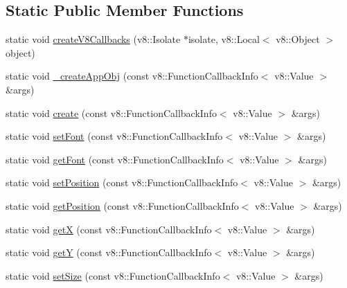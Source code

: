 \subsection*{Static Public Member Functions}
\begin{DoxyCompactItemize}
\item 
static void \mbox{\hyperlink{class_rad_j_a_v_1_1_g_u_i_1_1_g_object_a0f1685bec67283666b86f6203f39b91d}{create\+V8\+Callbacks}} (v8\+::\+Isolate $\ast$isolate, v8\+::\+Local$<$ v8\+::\+Object $>$ object)
\item 
static void \mbox{\hyperlink{class_rad_j_a_v_1_1_g_u_i_1_1_g_object_abc4ed6894b20794b891aedc8be3cb4a4}{\+\_\+create\+App\+Obj}} (const v8\+::\+Function\+Callback\+Info$<$ v8\+::\+Value $>$ \&args)
\item 
static void \mbox{\hyperlink{class_rad_j_a_v_1_1_g_u_i_1_1_g_object_a464807547d205bba7ab4208dd3fd0cd0}{create}} (const v8\+::\+Function\+Callback\+Info$<$ v8\+::\+Value $>$ \&args)
\item 
static void \mbox{\hyperlink{class_rad_j_a_v_1_1_g_u_i_1_1_g_object_a4ddf832d1cceee41b20792a4479bd106}{set\+Font}} (const v8\+::\+Function\+Callback\+Info$<$ v8\+::\+Value $>$ \&args)
\item 
static void \mbox{\hyperlink{class_rad_j_a_v_1_1_g_u_i_1_1_g_object_aeecc1caec38369cae568a380a0e4dc0c}{get\+Font}} (const v8\+::\+Function\+Callback\+Info$<$ v8\+::\+Value $>$ \&args)
\item 
static void \mbox{\hyperlink{class_rad_j_a_v_1_1_g_u_i_1_1_g_object_afa290a9dfceec5c365d11cb7943dea58}{set\+Position}} (const v8\+::\+Function\+Callback\+Info$<$ v8\+::\+Value $>$ \&args)
\item 
static void \mbox{\hyperlink{class_rad_j_a_v_1_1_g_u_i_1_1_g_object_a3473c4b2c305a73d67232d4714083f27}{get\+Position}} (const v8\+::\+Function\+Callback\+Info$<$ v8\+::\+Value $>$ \&args)
\item 
static void \mbox{\hyperlink{class_rad_j_a_v_1_1_g_u_i_1_1_g_object_ae2fcc3281fe80cce2d7ebbba4c144955}{getX}} (const v8\+::\+Function\+Callback\+Info$<$ v8\+::\+Value $>$ \&args)
\item 
static void \mbox{\hyperlink{class_rad_j_a_v_1_1_g_u_i_1_1_g_object_af4cb656f50fa79ed78510b97cf1799f8}{getY}} (const v8\+::\+Function\+Callback\+Info$<$ v8\+::\+Value $>$ \&args)
\item 
static void \mbox{\hyperlink{class_rad_j_a_v_1_1_g_u_i_1_1_g_object_a0742a971bdeb747fe721254e3cbe3029}{set\+Size}} (const v8\+::\+Function\+Callback\+Info$<$ v8\+::\+Value $>$ \&args)

\end{DoxyCompactItemize}
